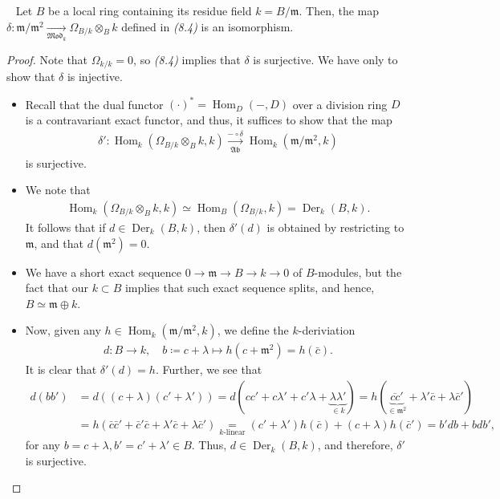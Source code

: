 \documentclass[11pt,a4paper,footinclude=true,headinclude=true]{scrbook} %
\DeclareMathOperator{\Hom}{Hom}
\DeclareMathOperator{\Der}{Der}
\newcommand{\mm}{\mathfrak{m}}
\newcommand{\Ab}{\mathfrak{Ab}}
\newcommand{\<}{\langle}
\newcommand{\>}{\rangle}
\newcommand{\MOD}{\mathfrak{Mod}}
\newenvironment{proposition}[2][]
{\renewcommand\theinnercustomprop{#2}\innercustomprop[#1] 
\begin{mdframed}[backgroundcolor=gray!20]\ }
{\end{mdframed}\endinnercustomprop}
\begin{document}
\begin{proposition}{8.7}
    Let $B$ be a local ring containing its residue field $k=B/\mm$. Then, the map\\ $\delta:\mm/\mm^2\xrightarrow[\MOD_k]{}\Omega_{B/k}\otimes_Bk$ defined in \textit{(8.4)} is an isomorphism.
\end{proposition}
\begin{proof}
    Note that $\Omega_{k/k}=0$, so \textit{(8.4)} implies that $\delta$ is surjective. We have only to show that $\delta$ is injective. 
    \begin{itemize}
        \item Recall that the dual functor $(\cdot)^\ast=\Hom_D(-,D)$ over a division ring $D$ is a contravariant exact functor, and thus, it suffices to show that the map
        \begin{align*}
            \delta':\Hom_k(\Omega_{B/k}\otimes_Bk,k)\xrightarrow[\Ab]{-\circ\delta}\Hom_k(\mm/\mm^2,k)
        \end{align*}
        is surjective. 
        \item We note that
        \begin{align*}
            \Hom_k(\Omega_{B/k}\otimes_Bk,k)\simeq\Hom_B(\Omega_{B/k},k)=\Der_k(B,k).
        \end{align*}
        It follows that if $d\in\Der_k(B,k)$, then $\delta'(d)$ is obtained by restricting to $\mm$, and that $d(\mm^2)=0$.
        \item We have a short exact sequence $0\to\mm\to B\to k\to0$ of $B$-modules, but the fact that our $k\subset B$ implies that such exact sequence splits, and hence, $B\simeq\mm\oplus k$.
        \item Now, given any $h\in\Hom_k(\mm/\mm^2,k)$, we define the $k$-deriviation
        \begin{align*}
            d:B\longrightarrow k,\quad b\coloneqq c+\lambda\longmapsto h(c+\mm^2)=h(\bar{c}).
        \end{align*}
        It is clear that $\delta'(d)=h$. Further, we see that
        \begin{align*}
            d(bb') &=d((c+\lambda)(c'+\lambda'))=d(cc'+c\lambda'+c'\lambda+\underbrace{\lambda\lambda'}_{\in k})=h(\underbrace{\overline{cc}'}_{\in\mm^2}+\lambda'\bar{c}+\lambda\bar{c}')\\ &=h(\bar{c}\bar{c}'+\bar{c}'\bar{c}+\lambda'\bar{c}+\lambda\bar{c}') \underset{k\text{-linear}}{=}(c'+\lambda')h(\bar{c})+(c+\lambda)h(\bar{c}')=b'db+bdb',
        \end{align*}
        for any $b=c+\lambda,b'=c'+\lambda'\in B$. Thus, $d\in\Der_k(B,k)$, and therefore, $\delta'$ is surjective.
    \end{itemize}
\end{proof}
\end{document}
